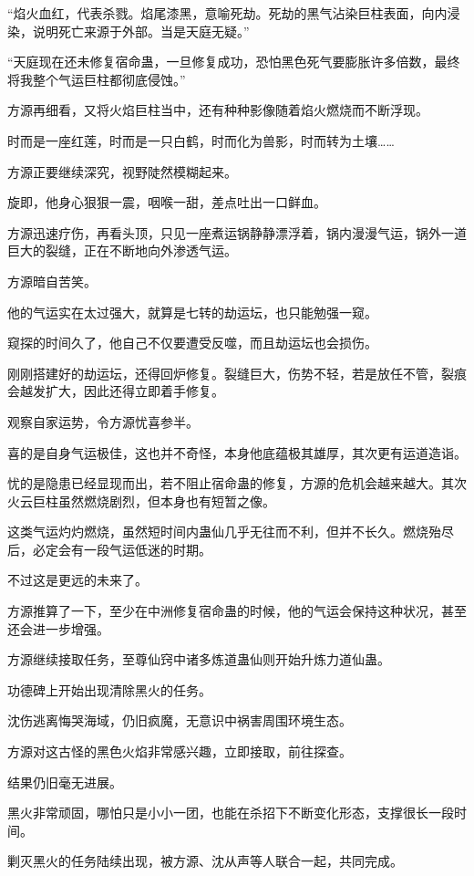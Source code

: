 \begin{this_body}
“焰火血红，代表杀戮。焰尾漆黑，意喻死劫。死劫的黑气沾染巨柱表面，向内浸染，说明死亡来源于外部。当是天庭无疑。”

“天庭现在还未修复宿命蛊，一旦修复成功，恐怕黑色死气要膨胀许多倍数，最终将我整个气运巨柱都彻底侵蚀。”

方源再细看，又将火焰巨柱当中，还有种种影像随着焰火燃烧而不断浮现。

时而是一座红莲，时而是一只白鹤，时而化为兽影，时而转为土壤……

方源正要继续深究，视野陡然模糊起来。

旋即，他身心狠狠一震，咽喉一甜，差点吐出一口鲜血。

方源迅速疗伤，再看头顶，只见一座煮运锅静静漂浮着，锅内漫漫气运，锅外一道巨大的裂缝，正在不断地向外渗透气运。

方源暗自苦笑。

他的气运实在太过强大，就算是七转的劫运坛，也只能勉强一窥。

窥探的时间久了，他自己不仅要遭受反噬，而且劫运坛也会损伤。

刚刚搭建好的劫运坛，还得回炉修复。裂缝巨大，伤势不轻，若是放任不管，裂痕会越发扩大，因此还得立即着手修复。

观察自家运势，令方源忧喜参半。

喜的是自身气运极佳，这也并不奇怪，本身他底蕴极其雄厚，其次更有运道造诣。

忧的是隐患已经显现而出，若不阻止宿命蛊的修复，方源的危机会越来越大。其次火云巨柱虽然燃烧剧烈，但本身也有短暂之像。

这类气运灼灼燃烧，虽然短时间内蛊仙几乎无往而不利，但并不长久。燃烧殆尽后，必定会有一段气运低迷的时期。

不过这是更远的未来了。

方源推算了一下，至少在中洲修复宿命蛊的时候，他的气运会保持这种状况，甚至还会进一步增强。

方源继续接取任务，至尊仙窍中诸多炼道蛊仙则开始升炼力道仙蛊。

功德碑上开始出现清除黑火的任务。

沈伤逃离悔哭海域，仍旧疯魔，无意识中祸害周围环境生态。

方源对这古怪的黑色火焰非常感兴趣，立即接取，前往探查。

结果仍旧毫无进展。

黑火非常顽固，哪怕只是小小一团，也能在杀招下不断变化形态，支撑很长一段时间。

剿灭黑火的任务陆续出现，被方源、沈从声等人联合一起，共同完成。


\end{this_body}
